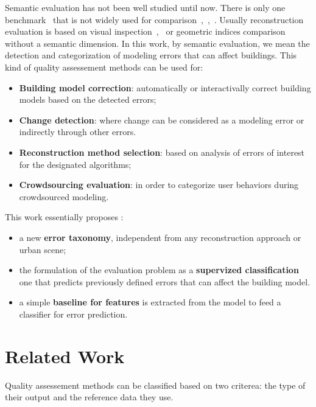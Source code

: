 \documentclass[runningheads]{llncs}
\begin{document}
	Semantic evaluation has not been well studied until now. There is only one benchmark~\cite{rottensteiner2014results} that is not widely used for comparison~\cite{Lafarge2012},~\cite{nguatem2017modeling},~\cite{li2016boxfitting}. Usually reconstruction evaluation is based on visual inspection~\cite{Musialski2012},~\cite{MacayMoreia2013} or geometric indices comparison~\cite{Kaartinen2005} without a semantic dimension. In this work, by semantic evaluation, we mean the detection and categorization of modeling errors that can affect buildings. This kind of quality assessement methods can be used for:
	\begin{itemize}
		\item \textbf{Building model correction}: automatically or interactivally correct building models based on the detected errors;
		\item \textbf{Change detection}: where change can be considered as a modeling error or indirectly through other errors.
		\item \textbf{Reconstruction method selection}: based on analysis of errors of interest for the designated algorithms;
		\item \textbf{Crowdsourcing evaluation}: in order to categorize user behaviors during crowdsourced modeling.
	\end{itemize}
	
	This work essentially proposes :
	\begin{itemize}
		\item a new \textbf{error taxonomy}, independent from any reconstruction approach or urban scene;
		\item the formulation of the evaluation problem as a \textbf{supervized classification} one that predicts previously defined errors that can affect the building model.
		\item a simple \textbf{baseline for features} is extracted from the model to feed a classifier for error prediction.
	\end{itemize}
\section{Related Work}

Quality assessement methods can be classified based on two criterea: the type of their output and the reference data they use.
\end{document}
